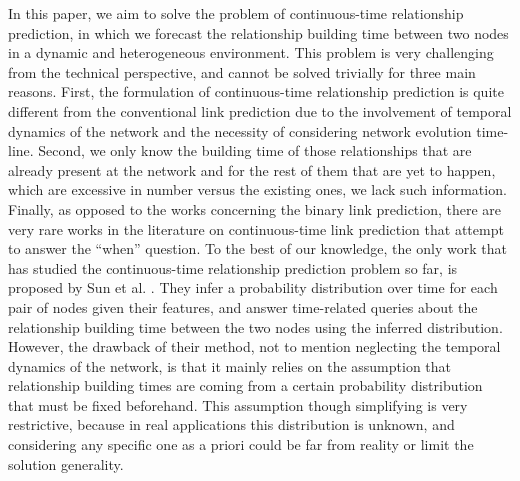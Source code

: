 In this paper, we aim to solve the problem of continuous-time relationship prediction, in which we forecast the relationship building time between two nodes in a dynamic and heterogeneous environment. This problem is very challenging from the technical perspective, and cannot be solved trivially for three main reasons. First, the formulation of continuous-time relationship prediction is quite different from the conventional link prediction due to the involvement of temporal dynamics of the network and the necessity of considering network evolution time-line. Second, we only know the building time of those relationships that are already present at the network and for the rest of them that are yet to happen, which are excessive in number versus the existing ones, we lack such information. Finally, as opposed to the works concerning the binary link prediction, there are very rare works in the literature on continuous-time link prediction that attempt to answer the ``when'' question. To the best of our knowledge, the only work that has studied the continuous-time relationship prediction problem so far, is proposed by Sun et al. \cite{sun2012will}. They infer a probability distribution over time for each pair of nodes given their features, and answer time-related queries about the relationship building time between the two nodes using the inferred distribution. However, the drawback of their method, not to mention neglecting the temporal dynamics of the network, is that it mainly relies on the assumption that relationship building times are coming from a certain probability distribution that must be fixed beforehand. This assumption though simplifying is very restrictive, because in real applications this distribution is unknown, and considering any specific one as a priori could be far from reality or limit the solution generality.

